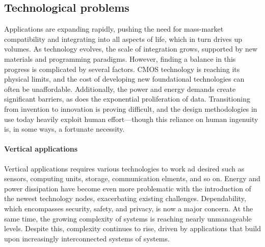 \subsection{Technological problems}
Applications are expanding rapidly, pushing the need for mass-market compatibility and integrating into all aspects of life, which in turn drives up volumes. 
As technology evolves, the scale of integration grows, supported by new materials and programming paradigms. 
However, finding a balance in this progress is complicated by several factors. 
CMOS technology is reaching its physical limits, and the cost of developing new foundational technologies can often be unaffordable. 
Additionally, the power and energy demands create significant barriers, as does the exponential proliferation of data. 
Transitioning from invention to innovation is proving difficult, and the design methodologies in use today heavily exploit human effort—though this reliance on human ingenuity is, in some ways, a fortunate necessity.

\paragraph*{Vertical applications}
Vertical applications requires various technologies to work ad desired such as sensors, computing units, storage, communication elments, and so on. 
Energy and power dissipation have become even more problematic with the introduction of the newest technology nodes, exacerbating existing challenges. 
Dependability, which encompasses security, safety, and privacy, is now a major concern. 
At the same time, the growing complexity of systems is reaching nearly unmanageable levels. 
Despite this, complexity continues to rise, driven by applications that build upon increasingly interconnected systems of systems.